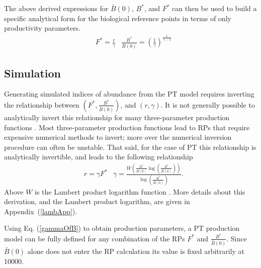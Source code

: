 %
The above derived expressions for $\bar B(0)$, $B^*$, and $F^*$ can then be used to
build a specific analytical form for the biological reference points in terms of only
productivity parameters.
\begin{align}\label{ptRP}
&F^* = \frac{r}{\gamma}
&\frac{B^*}{\bar B(0)} = \left(\frac{1}{\gamma}\right)^{\frac{1}{\gamma-1}}
\end{align}

%
\subsection{Simulation}

Generating simulated indices of abundance from the PT model requires
inverting the relationship between $\left(F^*, \frac{B^*}{\bar B(0)}\right)$, and
$(r, \gamma)$. It is not generally possible to analytically invert this
relationship for many three-parameter production functions \cite{punt_extending_2019, schnute_analytical_1998}. %
Most three-parameter production functions lead to RPs that require expensive
numerical methods to invert; more over the numerical inversion procedure can %
often be unstable. That said, for the case of PT this relationship is
analytically invertible, and leads to the following relationship
%
\begin{align}
&r = \gamma F^*
&\gamma = \frac{W\left(\frac{B^*}{\bar B(0)}\log\left(\frac{B^*}{\bar B(0)}\right)\right)}{\log\left(\frac{B^*}{\bar B(0)}\right)}. \label{gammaOfB}
\end{align}
%
Above $W$ is the Lambert product logarithm function \cite{lehtonen_lambert_2016, corless_lambertw_1996}. More details about this
derivation, and the Lambert product logarithm, are given in \mbox{Appendix (\ref{lambApp}).}

%
Using Eq. (\ref{gammaOfB}) to obtain production parameters, a PT production model
can be fully defined for any combination of the RPs $F^*$ and $\frac{B^*}{\bar B(0)}$.
Since $\bar B(0)$ alone does not enter the RP calculation its value is fixed arbitrarily at 10000.

